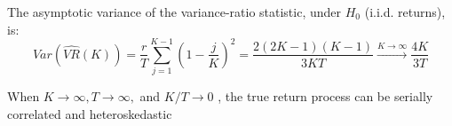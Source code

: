 The asymptotic variance of the variance-ratio statistic, under $H_0$ (i.i.d. returns), is:
\begin{equation}
    Var(\hat{VR}(K))=\frac{r}{T}\sum^{K-1}_{j=1}\left(1-\frac{j}{K}\right)^2=\frac{2(2K-1)(K-1)}{3KT} \xrightarrow{K\rightarrow \infty} \frac{4K}{3T}
\end{equation}

When $K\rightarrow\infty,T\rightarrow\infty,$ and $K/T\rightarrow 0$ \citep[p.~463]{priestley1981spectral}, the true return process can be serially correlated and heteroskedastic